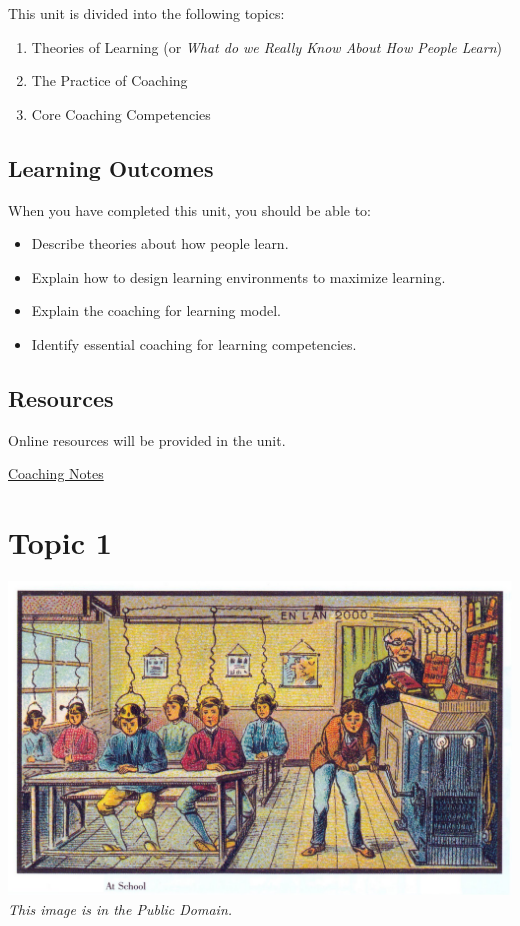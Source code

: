 \documentclass[
]{book}
\providecommand{\tightlist}{%
  \setlength{\itemsep}{0pt}\setlength{\parskip}{0pt}}
\begin{document}
This unit is divided into the following topics:

\begin{enumerate}
\def\labelenumi{\arabic{enumi}.}
\tightlist
\item
  Theories of Learning (or \emph{What do we Really Know About How People Learn})
\item
  The Practice of Coaching
\item
  Core Coaching Competencies
\end{enumerate}

\hypertarget{learning-outcomes-2}{%
\subsection*{Learning Outcomes}\label{learning-outcomes-2}}

When you have completed this unit, you should be able to:

\begin{itemize}
\tightlist
\item
  Describe theories about how people learn.
\item
  Explain how to design learning environments to maximize learning.
\item
  Explain the coaching for learning model.
\item
  Identify essential coaching for learning competencies.
\end{itemize}

\hypertarget{resources-3}{%
\subsection*{Resources}\label{resources-3}}

Online resources will be provided in the unit.

\href{https://ma-lead.github.io/ldrs663/coaching-notes.html}{Coaching Notes}

\hypertarget{topic-1}{%
\section*{Topic 1}\label{topic-1}}

\includegraphics{assets/u4/France_in_XXI_Century._School.jpg}
\emph{This image is in the Public Domain.}
\end{document}
